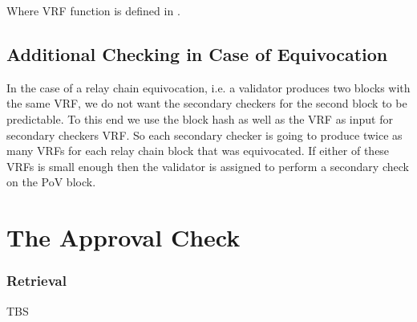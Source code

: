 {Where {\sc VRF} function is defined in \cite{polkadot-crypto-spec}.

\subsection{Additional Checking in Case of Equivocation}\label{sect-equivocation-case}
In the case of a relay chain equivocation, i.e. a validator produces two blocks with the same VRF, we do not want the secondary checkers for the second block to be predictable. To this end we use the block hash as well as the VRF as input for secondary checkers VRF. So each secondary checker is going to produce twice as many VRFs for each relay chain block that was equivocated. If either of these VRFs is small enough then the validator is assigned to perform a secondary check on the PoV block.

\section{The Approval Check}
\label{sect-approval-checking}
\subsubsection{Retrieval}
\label{sect-retrieval-of-erasure-pieces}
TBS




}
